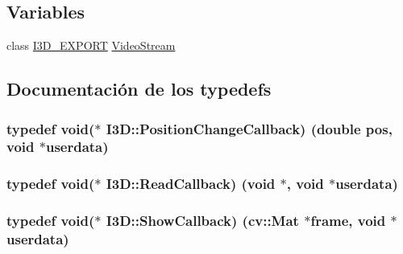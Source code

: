 \subsection*{Variables}
\begin{DoxyCompactItemize}
\item 
class \hyperlink{defs_8h_a83f373279ee1ca96b4003c673142ec1d}{I3\+D\+\_\+\+E\+X\+P\+O\+RT} \hyperlink{namespace_i3_d_a58775d79e6c0d424468e795402091a0a}{Video\+Stream}
\end{DoxyCompactItemize}


\subsection{Documentación de los \textquotesingle{}typedefs\textquotesingle{}}
\subsubsection[{\texorpdfstring{Position\+Change\+Callback}{PositionChangeCallback}}]{\setlength{\rightskip}{0pt plus 5cm}typedef void($\ast$ I3\+D\+::\+Position\+Change\+Callback) (double pos, void $\ast$userdata)}\hypertarget{namespace_i3_d_a923a852719565a9e40df22d8cd71281e}{}\label{namespace_i3_d_a923a852719565a9e40df22d8cd71281e}
\subsubsection[{\texorpdfstring{Read\+Callback}{ReadCallback}}]{\setlength{\rightskip}{0pt plus 5cm}typedef void($\ast$ I3\+D\+::\+Read\+Callback) (void $\ast$, void $\ast$userdata)}\hypertarget{namespace_i3_d_a7005f50d43ac0b10e2f50ab09994f45b}{}\label{namespace_i3_d_a7005f50d43ac0b10e2f50ab09994f45b}
\subsubsection[{\texorpdfstring{Show\+Callback}{ShowCallback}}]{\setlength{\rightskip}{0pt plus 5cm}typedef void($\ast$ I3\+D\+::\+Show\+Callback) (cv\+::\+Mat $\ast$frame, void $\ast$userdata)}\hypertarget{namespace_i3_d_a65da91c3d8b7751e061aa6d8462ea890}{}\label{namespace_i3_d_a65da91c3d8b7751e061aa6d8462ea890}



